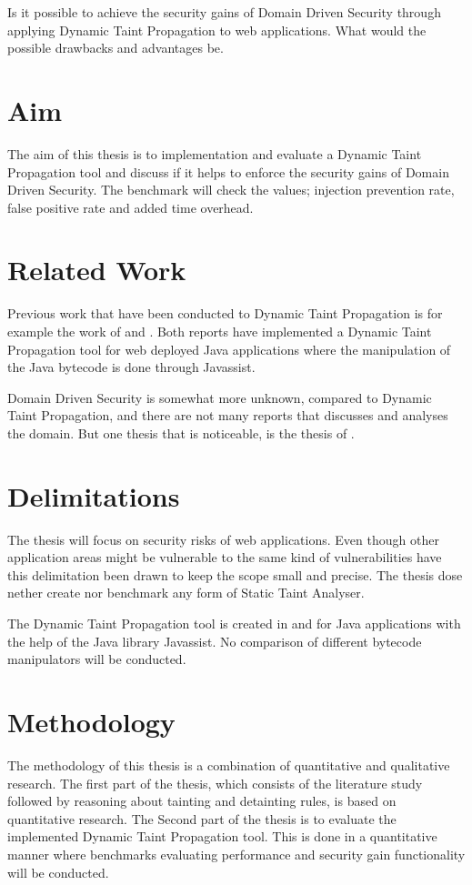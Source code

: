 \noindent
Is it possible to achieve the security gains of Domain Driven Security through applying Dynamic Taint Propagation to web applications. What would the possible drawbacks and advantages be.


\section{Aim}
The aim of this thesis is to implementation and evaluate a Dynamic Taint Propagation tool and discuss if it helps to enforce the security gains of Domain Driven Security. The benchmark will check the values; injection prevention rate, false positive rate and added time overhead. 


\section{Related Work}
Previous work that have been conducted to Dynamic Taint Propagation is for example the work of \textcite{Haldar} and \textcite{Zhao2016}. Both reports have implemented a Dynamic Taint Propagation tool for web deployed Java applications where the manipulation of the Java bytecode is done through Javassist.

Domain Driven Security is somewhat more unknown, compared to Dynamic Taint Propagation, and there are not many reports that discusses and analyses the domain. But one thesis that is noticeable, is the thesis of \textcite{Stendahl2016}.


\section{Delimitations}
The thesis will focus on security risks of web applications. Even though other application areas might be vulnerable to the same kind of vulnerabilities have this delimitation been drawn to keep the scope small and precise. The thesis dose nether create nor benchmark any form of Static Taint Analyser. 

The Dynamic Taint Propagation tool is created in and for Java applications with the help of the Java library Javassist. No comparison of different bytecode manipulators will be conducted.

\section{Methodology}
The methodology of this thesis is a combination of quantitative and qualitative research. The first part of the thesis, which consists of the literature study followed by reasoning about tainting and detainting rules, is based on quantitative research. The Second part of the thesis is to evaluate the implemented Dynamic Taint Propagation tool. This is done in a quantitative manner where benchmarks evaluating performance and security gain functionality will be conducted.
